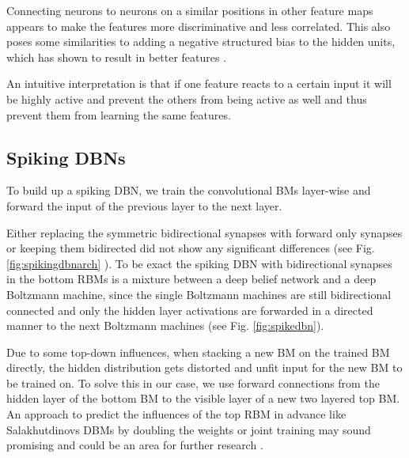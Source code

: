 Connecting neurons to neurons on a similar positions in other feature maps appears to make the features more discriminative and less correlated.
This also poses some similarities to adding a negative structured bias to the hidden units, which has shown to result in better features \cite{DBLP:journals/corr/KheradpishehGTM16}\cite{LeCun}\cite{NorouziM2009}.

An intuitive interpretation is that if one feature reacts to a certain input it will be highly active and prevent the others from being active as well and thus prevent them from learning the same features.  

\subsection{Spiking DBNs} \label{c:spikingdbn}

To build up a spiking DBN, we train the convolutional BMs layer-wise and forward the input of the previous layer to the next layer.

Either replacing the symmetric bidirectional synapses with forward only synapses or keeping them bidirected did not show any significant differences (see Fig. \ref{fig:spikingdbnarch} ). 
To be exact the spiking DBN with bidirectional synapses in the bottom RBMs is a mixture between a deep belief network and a deep Boltzmann machine, since the single Boltzmann machines are still bidirectional connected and only the hidden layer activations are forwarded in a directed manner to the next Boltzmann machines (see Fig. \ref{fig:spikedbn}).

Due to some top-down influences, when stacking a new BM  on the trained BM directly, the hidden distribution gets distorted and unfit input for the new BM to be trained on. 
To solve this in our case, we use forward connections from the hidden layer of the bottom BM to the visible layer of a new two layered top BM. 
An approach to predict the influences of the top RBM in advance like Salakhutdinovs DBMs by doubling the weights or joint training may sound promising and could be an area for further research \cite{salakhutdinov2009deep}.

